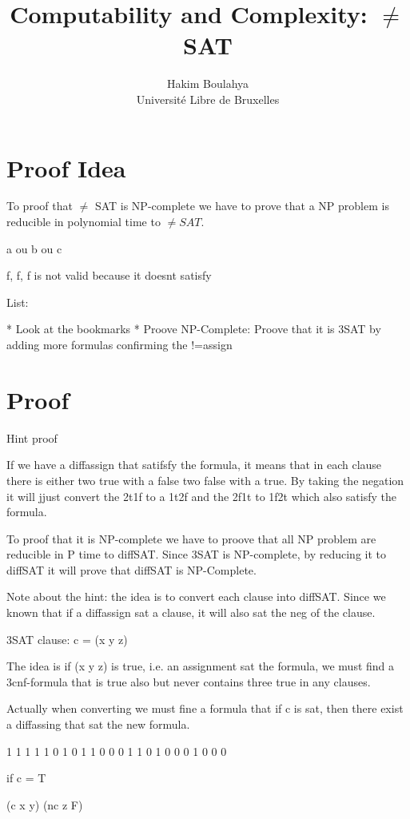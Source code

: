 \documentclass[letterpaper]{article}
\title{Computability and Complexity: $\not=$SAT}
\author{\Large Hakim Boulahya \\
Université Libre de Bruxelles
}
\begin{document}
\maketitle

\section*{Proof Idea}

To proof that $\not=$ SAT is NP-complete we have to prove that a NP problem is
reducible in polynomial time to $\not=SAT$.

a ou b ou c

f, f, f is not valid because it doesnt satisfy

List:

* Look at the bookmarks
* Proove NP-Complete: Proove that it is 3SAT by adding more formulas
confirming the !=assign

\section*{Proof}

Hint proof

If we have a diffassign that satifsfy the formula, it means that in each
clause there is either two true with a false two false with a true. By
taking the negation it will jjust convert the 2t1f to a 1t2f and the 2f1t to
1f2t which also satisfy the formula.


To proof that it is NP-complete we have to proove that all NP problem are
reducible in P time to diffSAT. Since 3SAT is NP-complete, by reducing it
to diffSAT it will prove that diffSAT is NP-Complete.

Note about the hint: the idea is to convert each clause into diffSAT.
Since we known that if a diffassign sat a clause, it will also sat the neg
of the clause.

3SAT clause: c = (x y z)

The idea is if (x y z) is true, i.e. an assignment sat the formula,
we must find a 3cnf-formula that is true also
but never contains three true in any clauses.

Actually when converting we must fine a formula that if c is sat, then
there exist a diffassing that sat the new formula.

1 1 1
1 1 0
1 0 1
1 0 0
0 1 1
0 1 0
0 0 1
0 0 0


if c = T

(c x y) (nc z F)
\end{document}

